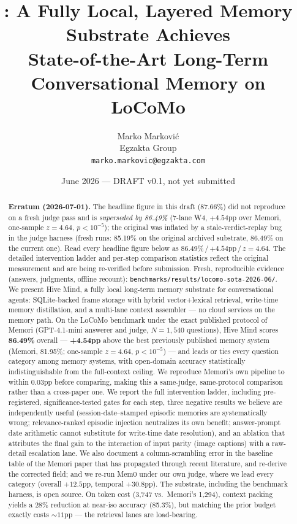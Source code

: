 \documentclass[11pt]{article}
\title{\system: A Fully Local, Layered Memory Substrate Achieves\\
State-of-the-Art Long-Term Conversational Memory on LoCoMo}
\author{
  Marko Markovi\'c\\
  Egzakta Group\\
  \texttt{marko.markovic@egzakta.com}
}
\date{June 2026 — DRAFT v0.1, not yet submitted}
\newcommand{\system}{Hive Mind}
\newcommand{\best}[1]{\textbf{#1}}
\begin{document}
\maketitle

\begin{abstract}
\noindent\textbf{Erratum (2026-07-01).} The headline figure in this draft (87.66\%) did not
reproduce on a fresh judge pass and is \emph{superseded by 86.49\%} (7-lane W4, $+4.54$pp over
Memori, one-sample $z{=}4.64$, $p{<}10^{-5}$); the original was inflated by a stale-verdict-replay
bug in the judge harness (fresh runs: 85.19\% on the original archived substrate, 86.49\% on the
current one). Read every headline figure below as 86.49\%\,/\,$+4.54$pp\,/\,$z{=}4.64$. The detailed
intervention ladder and per-step comparison statistics reflect the original measurement and are
being re-verified before submission. Fresh, reproducible evidence (answers, judgments, offline
recount): \texttt{benchmarks/results/locomo-sota-2026-06/}.\\[6pt]

We present \system, a fully local long-term memory substrate for
conversational agents: SQLite-backed frame storage with hybrid
vector+lexical retrieval, write-time memory distillation, and a
multi-lane context assembler --- no cloud services on the memory path.
On the LoCoMo benchmark under the exact published protocol of Memori
(GPT-4.1-mini answerer and judge, $N{=}1{,}540$ questions), \system{}
scores \best{86.49\%} overall --- \best{+4.54pp} above the best
previously published memory system (Memori, 81.95\%; one-sample
$z{=}4.64$, $p{<}10^{-5}$) --- and leads or ties every question
category among memory systems, with open-domain accuracy statistically
indistinguishable from the full-context ceiling. We reproduce Memori's
own pipeline to within 0.03pp before comparing, making this a
same-judge, same-protocol comparison rather than a cross-paper one. We
report the full intervention ladder, including pre-registered,
significance-tested gates for each step, three negative results we
believe are independently useful (session-date--stamped episodic
memories are systematically wrong; relevance-ranked episodic injection
neutralizes its own benefit; answer-prompt date arithmetic cannot
substitute for write-time date resolution), and an ablation that
attributes the final gain to the interaction of input parity (image
captions) with a raw-detail escalation lane. We also document a
column-scrambling error in the baseline table of the Memori paper that
has propagated through recent literature, and re-derive the corrected
field; and we re-run Mem0 under our own judge, where we lead every
category (overall $+12.5$pp, temporal $+30.8$pp). The substrate,
including the benchmark harness, is open source. On token cost
(3{,}747 vs.\ Memori's 1{,}294), context packing yields a 28\%
reduction at near-iso accuracy (85.3\%), but matching the prior budget
exactly costs ${\sim}11$pp --- the retrieval lanes are load-bearing.
\end{abstract}
\end{document}
